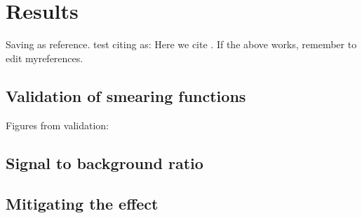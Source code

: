 \chapter{Results}\label{cha:res}
Saving as reference.
test citing as: Here we cite \citet{Duck:2005} \citep{Duck:2005}.
If the above works, remember to edit myreferences.
\section{Validation of smearing functions}
Figures from validation:
\section{Signal to background ratio}
\section{Mitigating the effect}





